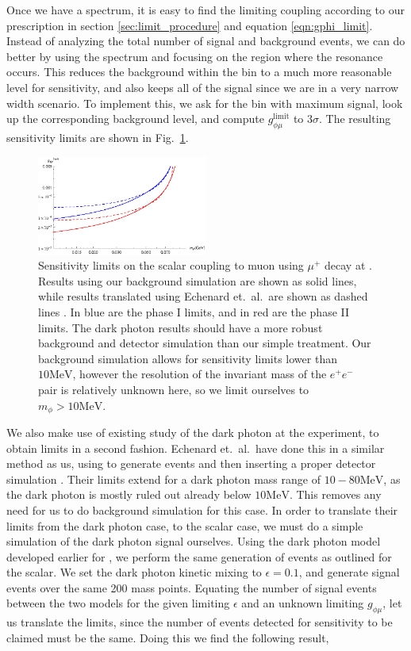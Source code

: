 Once we have a spectrum, it is easy to find the limiting coupling according to our prescription in section \ref{sec:limit_procedure} and equation \ref{eqn:gphi_limit}.
Instead of analyzing the total number of signal and background events, we can do better by using the spectrum and focusing on the region where the resonance occurs.
This reduces the background within the bin to a much more reasonable level for sensitivity, and also keeps all of the signal since we are in a very narrow width scenario.
To implement this, we ask for the bin with maximum signal, look up the corresponding background level, and compute $g_{\phi\mu}^\textrm{limit}$ to $3\sigma$.
The resulting sensitivity limits are shown in Fig.\ \ref{fig:mu3e_limits}.

\begin{figure}[h]
    \centering
    \includegraphics[width=0.5\textwidth]{Figures/limits/mu3e_all}
    \caption{Sensitivity limits on the scalar coupling to muon using $\mu^+$ decay at \mueee. Results using our background simulation are shown as solid lines, while results translated using Echenard et.\ al.\ are shown as dashed lines \cite{Echenard:2014lma}. In blue are the phase I limits, and in red are the phase II limits. The dark photon results should have a more robust background and detector simulation than our simple treatment. Our background simulation allows for sensitivity limits lower than $10\textrm{MeV}$, however the resolution of the invariant mass of the $e^+ e^-$ pair is relatively unknown here, so we limit ourselves to $m_\phi > 10\textrm{MeV}$.} 
    \label{fig:mu3e_limits}
\end{figure}

We also make use of existing study of the dark photon at the \mueee experiment, to obtain limits in a second fashion.
Echenard et.\ al.\ have done this in a similar method as us, using \madgraph to generate events and then inserting a proper detector simulation \cite{Echenard:2014lma}.
Their limits extend for a dark photon mass range of $10 - 80\textrm{MeV}$, as the dark photon is mostly ruled out already below $10\textrm{MeV}$.
This removes any need for us to do background simulation for this case.
In order to translate their limits from the dark photon case, to the scalar case, we must do a simple simulation of the dark photon signal ourselves.
Using the dark photon model developed earlier for \madgraph, we perform the same generation of events as outlined for the scalar.
We set the dark photon kinetic mixing to $\epsilon = 0.1$, and generate signal events over the same 200 mass points.
Equating the number of signal events between the two models for the given limiting $\epsilon$ and an unknown limiting $g_{\phi\mu}$, let us translate the limits, since the number of events detected for sensitivity to be claimed must be the same.
Doing this we find the following result,


